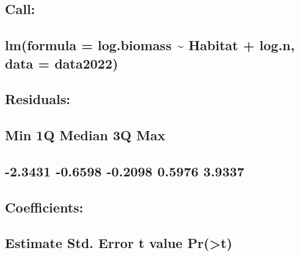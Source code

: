 \documentclass[
]{article}
\begin{document}
\hypertarget{call}{%
\subsection{Call:}\label{call}}

\hypertarget{lmformula-log.biomass-habitat-log.n-data-data2022}{%
\subsection{lm(formula = log.biomass \textasciitilde{} Habitat + log.n,
data =
data2022)}\label{lmformula-log.biomass-habitat-log.n-data-data2022}}

\hypertarget{section-45}{%
\subsection{}\label{section-45}}

\hypertarget{residuals}{%
\subsection{Residuals:}\label{residuals}}

\hypertarget{min-1q-median-3q-max}{%
\subsection{Min 1Q Median 3Q Max}\label{min-1q-median-3q-max}}

\hypertarget{section-46}{%
\subsection{-2.3431 -0.6598 -0.2098 0.5976 3.9337}\label{section-46}}

\hypertarget{section-47}{%
\subsection{}\label{section-47}}

\hypertarget{coefficients}{%
\subsection{Coefficients:}\label{coefficients}}

\hypertarget{estimate-std.-error-t-value-prt}{%
\subsection{Estimate Std. Error t value
Pr(\textgreater\textbar t\textbar)}\label{estimate-std.-error-t-value-prt}}
\end{document}
